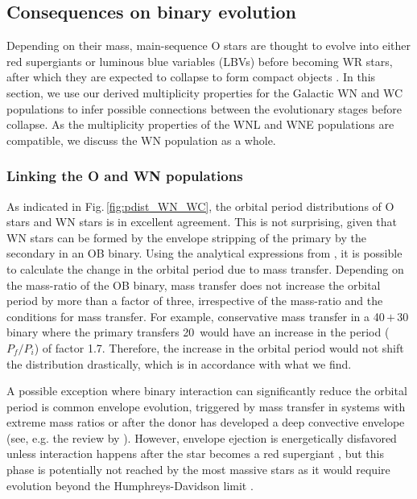 \subsection{Consequences on binary evolution}  \label{sect:orbitalprop}
Depending on their mass, main-sequence O stars are thought to evolve into either red supergiants or luminous blue variables (LBVs) before becoming WR stars, after which they are expected to collapse to form compact objects \citep{1976Conti,meynet_stellar_2003,crowther_physical_2007,langer_presupernova_2012}. In this section, we use our derived multiplicity properties for the Galactic WN and WC populations to infer possible connections between the evolutionary stages before collapse. As the multiplicity properties of the WNL and WNE populations are compatible, we discuss the WN population as a whole. 


\subsubsection{Linking the O and WN populations}\label{sect:OWN}

As indicated in Fig.\,\ref{fig:pdist_WN_WC}, the orbital period distributions of O stars and WN stars is in excellent agreement. This is not surprising, given that WN stars can be formed by the envelope stripping of the primary by the secondary in an OB binary. Using the analytical expressions from \citet{soberman_stability_1997}, it is possible to calculate the change in the orbital period due to mass transfer. Depending on the mass-ratio of the OB binary, mass transfer does not increase the orbital period by more than a factor of three, irrespective of the mass-ratio and the conditions for mass transfer. For example, conservative mass transfer in a 40\,$+$\,30\,\Msun{} binary where the primary transfers 20\,\Msun{} would have an increase in the period ($P_f/P_i$) of factor 1.7. Therefore, the increase in the orbital period would not shift the distribution drastically, which is in accordance with what we find. 

A possible exception where binary interaction can significantly reduce the orbital period is common envelope evolution, triggered by mass transfer in systems with extreme mass ratios or after the donor has developed a deep convective envelope (see, e.g. the review by \citealt{ivanova_common_2013}). However, envelope ejection is energetically disfavored unless interaction happens after the star becomes a red supergiant \citep[e.g.][]{klencki_it_2021}, but this phase is potentially not reached by the most massive stars as it would require evolution beyond the Humphreys-Davidson limit \citep{humphreys_studies_1979,davies_luminosities_2018,gilkis_excess_2021}.

